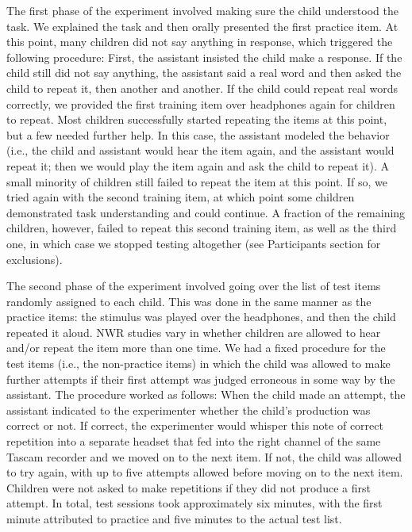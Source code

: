 \documentclass[
  american,
  ,man,floatsintext]{apa6}
\begin{document}
The first phase of the experiment involved making sure the child understood the task. We explained the task and then orally presented the first practice item. At this point, many children did not say anything in response, which triggered the following procedure: First, the assistant insisted the child make a response. If the child still did not say anything, the assistant said a real word and then asked the child to repeat it, then another and another. If the child could repeat real words correctly, we provided the first training item over headphones again for children to repeat. Most children successfully started repeating the items at this point, but a few needed further help. In this case, the assistant modeled the behavior (i.e., the child and assistant would hear the item again, and the assistant would repeat it; then we would play the item again and ask the child to repeat it). A small minority of children still failed to repeat the item at this point. If so, we tried again with the second training item, at which point some children demonstrated task understanding and could continue. A fraction of the remaining children, however, failed to repeat this second training item, as well as the third one, in which case we stopped testing altogether (see Participants section for exclusions).

The second phase of the experiment involved going over the list of test items randomly assigned to each child. This was done in the same manner as the practice items: the stimulus was played over the headphones, and then the child repeated it aloud. NWR studies vary in whether children are allowed to hear and/or repeat the item more than one time. We had a fixed procedure for the test items (i.e., the non-practice items) in which the child was allowed to make further attempts if their first attempt was judged erroneous in some way by the assistant. The procedure worked as follows: When the child made an attempt, the assistant indicated to the experimenter whether the child's production was correct or not. If correct, the experimenter would whisper this note of correct repetition into a separate headset that fed into the right channel of the same Tascam recorder and we moved on to the next item. If not, the child was allowed to try again, with up to five attempts allowed before moving on to the next item. Children were not asked to make repetitions if they did not produce a first attempt. In total, test sessions took approximately six minutes, with the first minute attributed to practice and five minutes to the actual test list.
\end{document}
